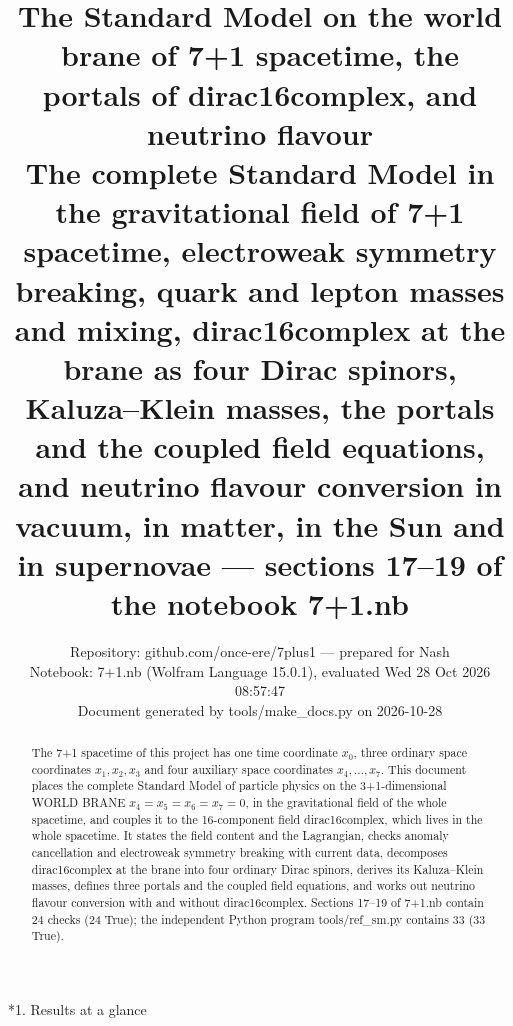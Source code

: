 \documentclass[10pt,a4paper]{article}
\makeatletter
\renewcommand\section{\@startsection{section}{1}{\z@}{-3.5ex \@plus -1ex \@minus -.2ex}{2.3ex \@plus.2ex}{\normalfont\Large\bfseries\raggedright}}
\makeatother
\begin{document}
\title{The Standard Model on the world brane of 7+1 spacetime, the portals of dirac16complex, and neutrino flavour\\[0.4em]\large The complete Standard Model in the gravitational field of 7+1 spacetime, electroweak symmetry breaking, quark and lepton masses and mixing, dirac16complex at the brane as four Dirac spinors, Kaluza–Klein masses, the portals and the coupled field equations, and neutrino flavour conversion in vacuum, in matter, in the Sun and in supernovae — sections 17–19 of the notebook 7+1.nb}
\author{Repository: github.com/once-ere/7plus1 — prepared for Nash\\ Notebook: 7+1.nb (Wolfram Language 15.0.1), evaluated Wed 28 Oct 2026 08:57:47\\ Document generated by tools/make\_docs.py on 2026-10-28}
\date{}
\maketitle
\begin{abstract}
The 7+1 spacetime of this project has one time coordinate $x_0$, three ordinary space coordinates $x_1,x_2,x_3$ and four auxiliary space coordinates $x_4,\dots,x_7$. This document places the complete Standard Model of particle physics on the 3+1-dimensional WORLD BRANE $x_4=x_5=x_6=x_7=0$, in the gravitational field of the whole spacetime, and couples it to the 16-component field dirac16complex, which lives in the whole spacetime. It states the field content and the Lagrangian, checks anomaly cancellation and electroweak symmetry breaking with current data, decomposes dirac16complex at the brane into four ordinary Dirac spinors, derives its Kaluza–Klein masses, defines three portals and the coupled field equations, and works out neutrino flavour conversion with and without dirac16complex. Sections 17–19 of 7+1.nb contain 24 checks (24 True); the independent Python program tools/ref\_sm.py contains 33 (33 True).
\end{abstract}
\tableofcontents
{}\section*{1. Results at a glance}
\end{document}
